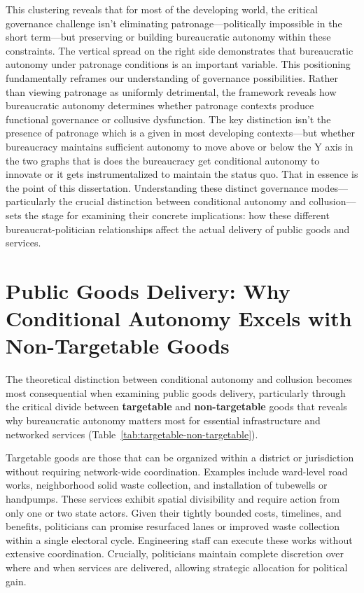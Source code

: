 This clustering reveals that for most of the developing world, the critical governance challenge isn't
eliminating patronage—politically impossible in the short term—but preserving or building bureaucratic
autonomy within these constraints. The vertical spread on the right side demonstrates that bureaucratic
autonomy under patronage conditions is an important variable. This positioning fundamentally reframes
our understanding of governance possibilities. Rather than viewing patronage as uniformly detrimental,
the framework reveals how bureaucratic autonomy determines whether patronage contexts produce
functional governance or collusive dysfunction. The key distinction isn't the presence of patronage which is a given in most developing contexts—but whether bureaucracy maintains sufficient autonomy
to move above or below the Y axis in the two graphs that is does the bureaucracy get conditional
autonomy to innovate or it gets instrumentalized to maintain the status quo. That in essence is the point
of this dissertation.
Understanding these distinct governance modes—particularly the crucial distinction between
conditional autonomy and collusion—sets the stage for examining their concrete implications: how
these different bureaucrat-politician relationships affect the actual delivery of public goods and services.


\section{Public Goods Delivery: Why Conditional Autonomy Excels with Non-Targetable Goods}

The theoretical distinction between conditional autonomy and collusion becomes most consequential when examining public goods delivery, particularly through the critical divide between \textbf{targetable} and \textbf{non-targetable} goods that reveals why bureaucratic autonomy matters most for essential infrastructure and networked services (Table~\ref{tab:targetable-non-targetable}).

Targetable goods are those that can be organized within a district or jurisdiction without requiring network-wide coordination. Examples include ward-level road works, neighborhood solid waste collection, and installation of tubewells or handpumps. These services exhibit spatial divisibility and require action from only one or two state actors. Given their tightly bounded costs, timelines, and benefits, politicians can promise resurfaced lanes or improved waste collection within a single electoral cycle. Engineering staff can execute these works without extensive coordination. Crucially, politicians maintain complete discretion over where and when services are delivered, allowing strategic allocation for political gain.

